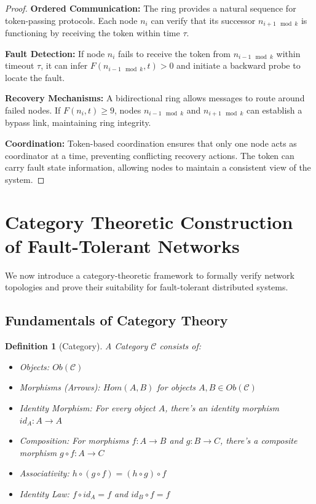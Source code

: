 \documentclass{article}
\newtheorem{definition}{Definition}
\begin{document}
\begin{proof}
\textbf{Ordered Communication:} The ring provides a natural sequence for token-passing protocols. Each node $n_i$ can verify that its successor $n_{i+1 \mod k}$ is functioning by receiving the token within time $\tau$.

\textbf{Fault Detection:} If node $n_i$ fails to receive the token from $n_{i-1 \mod k}$ within timeout $\tau$, it can infer $F(n_{i-1 \mod k}, t) > 0$ and initiate a backward probe to locate the fault.

\textbf{Recovery Mechanisms:} A bidirectional ring allows messages to route around failed nodes. If $F(n_i, t) \geq 9$, nodes $n_{i-1 \mod k}$ and $n_{i+1 \mod k}$ can establish a bypass link, maintaining ring integrity.

\textbf{Coordination:} Token-based coordination ensures that only one node acts as coordinator at a time, preventing conflicting recovery actions. The token can carry fault state information, allowing nodes to maintain a consistent view of the system.
\end{proof}

\section{Category Theoretic Construction of Fault-Tolerant Networks}

We now introduce a category-theoretic framework to formally verify network topologies and prove their suitability for fault-tolerant distributed systems.

\subsection{Fundamentals of Category Theory}

\begin{definition}[Category]
A Category $\mathcal{C}$ consists of:
\begin{itemize}
\item Objects: $Ob(\mathcal{C})$
\item Morphisms (Arrows): $Hom(A, B)$ for objects $A, B \in Ob(\mathcal{C})$
\item Identity Morphism: For every object $A$, there's an identity morphism $id_A: A \to A$
\item Composition: For morphisms $f: A \to B$ and $g: B \to C$, there's a composite morphism $g \circ f: A \to C$
\item Associativity: $h \circ (g \circ f) = (h \circ g) \circ f$
\item Identity Law: $f \circ id_A = f$ and $id_B \circ f = f$
\end{itemize}
\end{definition}
\end{document}
